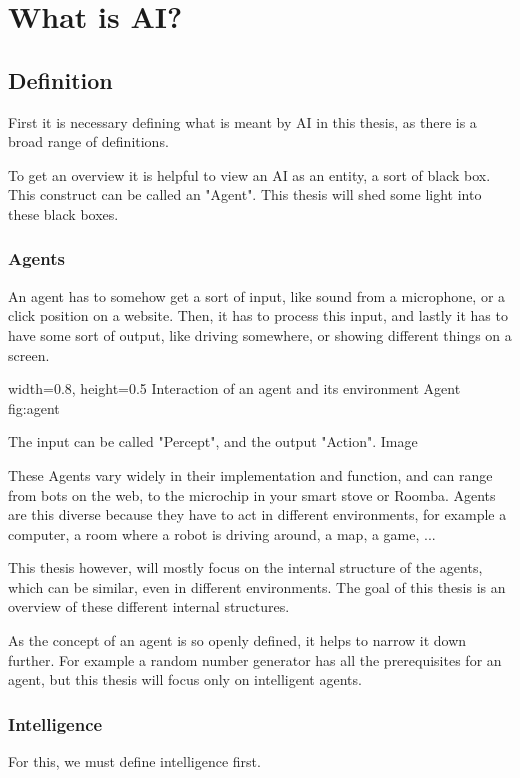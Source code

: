 \chapter{What is AI?}
\section{Definition}
First it is necessary defining what is meant by AI in this thesis, as there is a broad range of definitions.%

To get an overview it is helpful to view an AI as an entity, a sort of black box. This construct can be called an "Agent". 
This thesis will shed some light into these black boxes.

\subsection{Agents}
An agent has to somehow get a sort of input, like sound from a microphone, or a click position on a website.
Then, it has to process this input, 
and lastly it has to have some sort of output, like driving somewhere, or showing different things on a screen.

    {width=0.8\textwidth, height=0.5\textheight} %
    {Interaction of an agent and its environment}   %
    {Agent}   %
    {fig:agent}    %

The input can be called "Percept", and the output "Action". %
Image

These Agents vary widely in their implementation and function, and can range from bots on the web, to the microchip in your smart stove or Roomba. 
Agents are this diverse because they have to act in different environments, for example a computer, a room where a robot is driving around, a map, a game, ...

This thesis however, will mostly focus on the internal structure of the agents, which can be similar, even in different environments.
The goal of this thesis is an overview of these different internal structures.

As the concept of an agent is so openly defined, it helps to narrow it down further. For example a random number generator has all the prerequisites for an agent, but this thesis will focus only on intelligent agents.

\subsection{Intelligence}
For this, we must define intelligence first.

